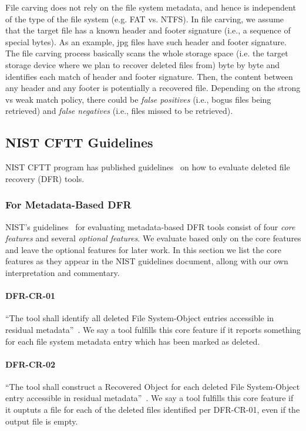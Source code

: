 File carving does not rely on the file system metadata, and hence is independent of the type of the 
file system (e.g. FAT vs. NTFS). In file carving, we assume that the target file has 
a known header and footer signature (i.e., a sequence of special bytes). As an example, 
jpg files have such header and footer signature. The file carving process basically
scans the whole storage space (i.e. the target storage device where we plan to recover deleted files from) 
byte by byte and identifies each match of header and footer signature. 
Then, the content between any header and any footer is potentially a recovered file. 
Depending on the strong vs weak match policy, there could be \emph{false positives} 
(i.e., bogus files being retrieved) 
and \emph{false negatives} (i.e., files missed to be retrieved). 

\subsection{NIST CFTT Guidelines}
NIST CFTT program has published guidelines~\cite{meta:dfr:standards,carving_standards} on how to evaluate deleted file recovery (DFR) tools.

\subsubsection{For Metadata-Based DFR}
NIST's guidelines~\cite{meta:dfr:standards} for evaluating metadata-based DFR tools consist of four \emph{core features} and several \emph{optional features}. We evaluate based only on the core features and leave the optional features for later work.
In this section we list the core features as they appear in the NIST guidelines document, allong with our own interpretation and commentary.

 \paragraph{DFR-CR-01} ``The tool shall identify all deleted File System-Object entries accessible in residual metadata''~\cite{meta:dfr:standards}.
 We say a tool fulfills this core feature if it reports something for each file system metadata entry which has been marked as deleted.
 
 \paragraph{DFR-CR-02} ``The tool shall construct a Recovered Object for each deleted File System-Object entry accessible in residual metadata''~\cite{meta:dfr:standards}.
 We say a tool fulfills this core feature if it ouptuts a file for each of the deleted files identified per DFR-CR-01, even if the output file is empty.

